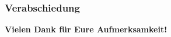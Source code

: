 \begin{frame}[c]
    \frametitle{Verabschiedung}
    \centering
    \huge\textbf{Vielen Dank für Eure Aufmerksamkeit!}
\end{frame}
